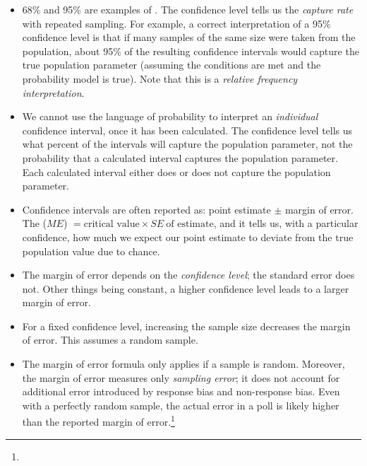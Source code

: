 \begin{itemize}
\item 68\% and 95\% are examples of .  The confidence level tells us the \emph{capture rate} with repeated sampling.  For example, a correct interpretation of a 95\% confidence level is that if many samples of the same size were taken from the population, about 95\% of the resulting confidence intervals would capture the true population parameter (assuming the conditions are met and the probability model is true).  Note that this is a \emph{relative frequency interpretation}.  

\item We cannot use the language of probability to interpret an \emph{individual} confidence interval, once it has been calculated.  The confidence level tells us what percent of the intervals will capture the population parameter, not the probability that a calculated interval captures the population parameter.  Each calculated interval either does or does not capture the population parameter.  
\end{itemize}


\D{\newpage\noindent%
}
\noindent\begin{itemize}
\item Confidence intervals are often reported as: point estimate $\pm$ margin of error.  The  ($ME$) $=\text{critical value} \times SE\ \text{of estimate}$, and it tells us, with a particular confidence, how much we expect our point estimate to deviate from the true population value due to chance.  

\item The margin of error depends on the \emph{confidence level}; the standard error does not.  Other things being constant, a higher confidence level leads to a larger margin of error.  

\item For a fixed confidence level, increasing the sample size decreases the margin of error.  This assumes a random sample.

\item The margin of error formula only applies if a sample is random.  Moreover, the margin of error measures only \emph{sampling error}; it does not account for additional error introduced by response bias and non-response bias.  Even with a perfectly random sample, the actual error in a poll is likely higher than the reported margin of error.\footnote{}

\end{itemize}


